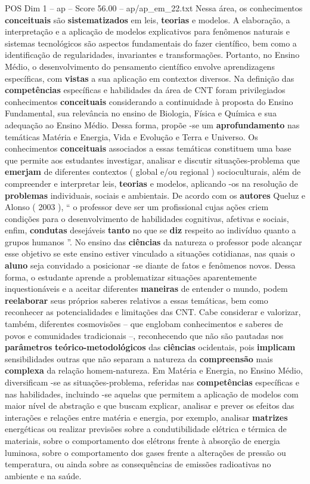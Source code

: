 \begin{textsample}{POS Dim 1 – ap – Score 56.00 – ap/ap\_em\_22.txt}
Nessa área, os conhecimentos \textbf{conceituais} são \textbf{sistematizados} em leis, \textbf{teorias} e modelos.
A elaboração, a interpretação e a aplicação de modelos explicativos para fenômenos naturais e sistemas tecnológicos são aspectos fundamentais do fazer científico, bem como a identificação de regularidades, invariantes e transformações.
Portanto, no Ensino Médio, o desenvolvimento do pensamento científico envolve aprendizagens específicas, com \textbf{vistas} a sua aplicação em contextos diversos.
Na definição das \textbf{competências} específicas e habilidades da área de CNT foram privilegiados conhecimentos \textbf{conceituais} considerando a continuidade à proposta do Ensino Fundamental, sua relevância no ensino de Biologia, Física e Química e sua adequação ao Ensino Médio.
Dessa forma, propõe -se um \textbf{aprofundamento} nas temáticas Matéria e Energia, Vida e Evolução e Terra e Universo.
Os conhecimentos \textbf{conceituais} associados a essas temáticas constituem uma base que permite aos estudantes investigar, analisar e discutir situações-problema que \textbf{emerjam} de diferentes contextos ( global e/ou regional ) socioculturais, além de compreender e interpretar leis, \textbf{teorias} e modelos, aplicando -os na resolução de \textbf{problemas} individuais, sociais e ambientais.
De acordo com os \textbf{autores} Queluz e Alonso ( 2003 ), “ o professor deve ser um profissional cujas ações criem condições para o desenvolvimento de habilidades cognitivas, afetivas e sociais, enfim, \textbf{condutas} desejáveis \textbf{tanto} no que se \textbf{diz} respeito ao indivíduo quanto a grupos humanos ”.
No ensino das \textbf{ciências} da natureza o professor pode alcançar esse objetivo se este ensino estiver vinculado a situações cotidianas, nas quais o \textbf{aluno} seja convidado a posicionar -se diante de fatos e fenômenos novos.
Dessa forma, o estudante aprende a problematizar situações aparentemente inquestionáveis e a aceitar diferentes \textbf{maneiras} de entender o mundo, podem \textbf{reelaborar} seus próprios saberes relativos a essas temáticas, bem como reconhecer as potencialidades e limitações das CNT.
Cabe considerar e valorizar, também, diferentes cosmovisões – que englobam conhecimentos e saberes de povos e comunidades tradicionais –, reconhecendo que não são pautadas nos \textbf{parâmetros} \textbf{teórico-metodológicos} das \textbf{ciências} ocidentais, pois \textbf{implicam} sensibilidades outras que não separam a natureza da \textbf{compreensão} mais \textbf{complexa} da relação homem-natureza.
Em Matéria e Energia, no Ensino Médio, diversificam -se as situações-problema, referidas nas \textbf{competências} específicas e nas habilidades, incluindo -se aquelas que permitem a aplicação de modelos com maior nível de abstração e que buscam explicar, analisar e prever os efeitos das interações e relações entre matéria e energia, por exemplo, analisar \textbf{matrizes} energéticas ou realizar previsões sobre a condutibilidade elétrica e térmica de materiais, sobre o comportamento dos elétrons frente à absorção de energia luminosa, sobre o comportamento dos gases frente a alterações de pressão ou temperatura, ou ainda sobre as consequências de emissões radioativas no ambiente e na saúde.

\end{textsample}
